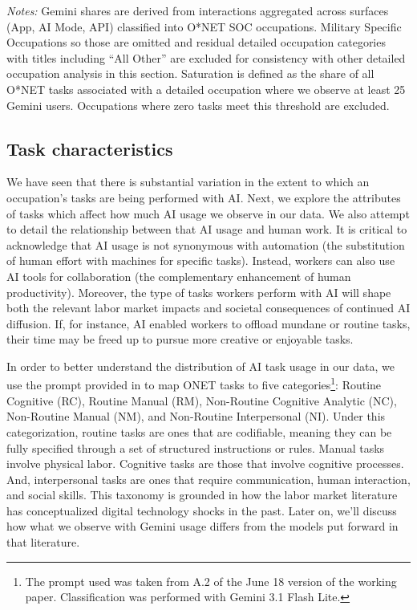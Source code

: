 \documentclass[11pt,a4paper]{article}
\begin{document}
\begin{table}[htbp]
    \centering
    \caption{Occupations With the Most/Least Task Saturation Among Those With Gemini Usage}
    \label{tab:table_2_2}
    
    \vspace{0.2cm}
    \parbox{\textwidth}{\footnotesize \textit{Notes:} Gemini shares are derived from interactions aggregated across surfaces (App, AI Mode, API) classified into O*NET SOC occupations. Military Specific Occupations so those are omitted and residual detailed occupation categories with titles including ``All Other'' are excluded for consistency with other detailed occupation analysis in this section. Saturation is defined as the share of all O*NET tasks associated with a detailed occupation where we observe at least 25 Gemini users. Occupations where zero tasks meet this threshold are excluded.}
\end{table}

\subsection{Task characteristics}

We have seen that there is substantial variation in the extent to which an occupation's tasks are being performed with AI. Next, we explore the attributes of tasks which affect how much AI usage we observe in our data. We also attempt to detail the relationship between that AI usage and human work. It is critical to acknowledge that AI usage is not synonymous with automation (the substitution of human effort with machines for specific tasks). Instead, workers can also use AI tools for collaboration (the complementary enhancement of human productivity). Moreover, the type of tasks workers perform with AI will shape both the relevant labor market impacts and societal consequences of continued AI diffusion. If, for instance, AI enabled workers to offload mundane or routine tasks, their time may be freed up to pursue more creative or enjoyable tasks.

In order to better understand the distribution of AI task usage in our data, we use the prompt provided in \citet{NBERw33941} to map ONET tasks to five categories\footnote{The prompt used was taken from A.2 of the June 18 version of the working paper. Classification was performed with Gemini 3.1 Flash Lite.}: Routine Cognitive (RC), Routine Manual (RM), Non-Routine Cognitive Analytic (NC), Non-Routine Manual (NM), and Non-Routine Interpersonal (NI). Under this categorization, routine tasks are ones that are codifiable, meaning they can be fully specified through a set of structured instructions or rules. Manual tasks involve physical labor. Cognitive tasks are those that involve cognitive processes. And, interpersonal tasks are ones that require communication, human interaction, and social skills. This taxonomy is grounded in how the labor market literature has conceptualized digital technology shocks in the past. Later on, we'll discuss how what we observe with Gemini usage differs from the models put forward in that literature.
\end{document}
